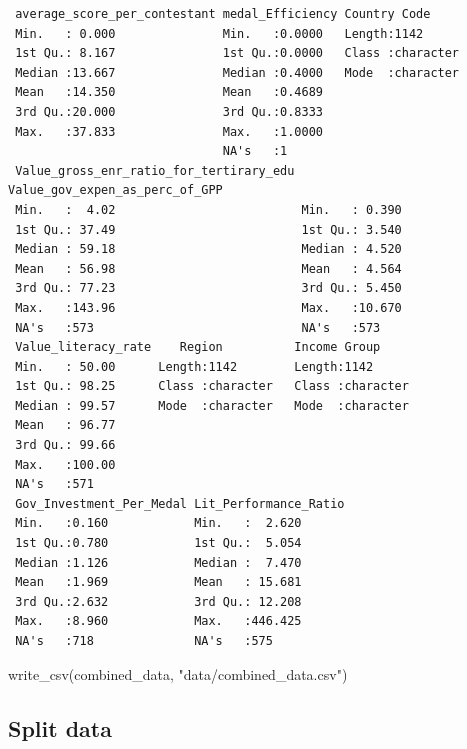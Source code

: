 \documentclass[
  letterpaper,
  DIV=11,
  numbers=noendperiod]{scrartcl}
\newenvironment{Shaded}{\begin{snugshade}}{\end{snugshade}}
\newcommand{\FunctionTok}[1]{\textcolor[rgb]{0.28,0.35,0.67}{#1}}
\newcommand{\NormalTok}[1]{\textcolor[rgb]{0.00,0.23,0.31}{#1}}
\newcommand{\StringTok}[1]{\textcolor[rgb]{0.13,0.47,0.30}{#1}}
\begin{document}
\begin{verbatim}
 average_score_per_contestant medal_Efficiency Country Code      
 Min.   : 0.000               Min.   :0.0000   Length:1142       
 1st Qu.: 8.167               1st Qu.:0.0000   Class :character  
 Median :13.667               Median :0.4000   Mode  :character  
 Mean   :14.350               Mean   :0.4689                     
 3rd Qu.:20.000               3rd Qu.:0.8333                     
 Max.   :37.833               Max.   :1.0000                     
                              NA's   :1                          
 Value_gross_enr_ratio_for_tertirary_edu Value_gov_expen_as_perc_of_GPP
 Min.   :  4.02                          Min.   : 0.390                
 1st Qu.: 37.49                          1st Qu.: 3.540                
 Median : 59.18                          Median : 4.520                
 Mean   : 56.98                          Mean   : 4.564                
 3rd Qu.: 77.23                          3rd Qu.: 5.450                
 Max.   :143.96                          Max.   :10.670                
 NA's   :573                             NA's   :573                   
 Value_literacy_rate    Region          Income Group      
 Min.   : 50.00      Length:1142        Length:1142       
 1st Qu.: 98.25      Class :character   Class :character  
 Median : 99.57      Mode  :character   Mode  :character  
 Mean   : 96.77                                           
 3rd Qu.: 99.66                                           
 Max.   :100.00                                           
 NA's   :571                                              
 Gov_Investment_Per_Medal Lit_Performance_Ratio
 Min.   :0.160            Min.   :  2.620      
 1st Qu.:0.780            1st Qu.:  5.054      
 Median :1.126            Median :  7.470      
 Mean   :1.969            Mean   : 15.681      
 3rd Qu.:2.632            3rd Qu.: 12.208      
 Max.   :8.960            Max.   :446.425      
 NA's   :718              NA's   :575          
\end{verbatim}

\begin{Shaded}
\begin{Highlighting}[]
\FunctionTok{write\_csv}\NormalTok{(combined\_data, }\StringTok{"data/combined\_data.csv"}\NormalTok{)}
\end{Highlighting}
\end{Shaded}

\subsection{Split data}\label{split-data}
\end{document}
